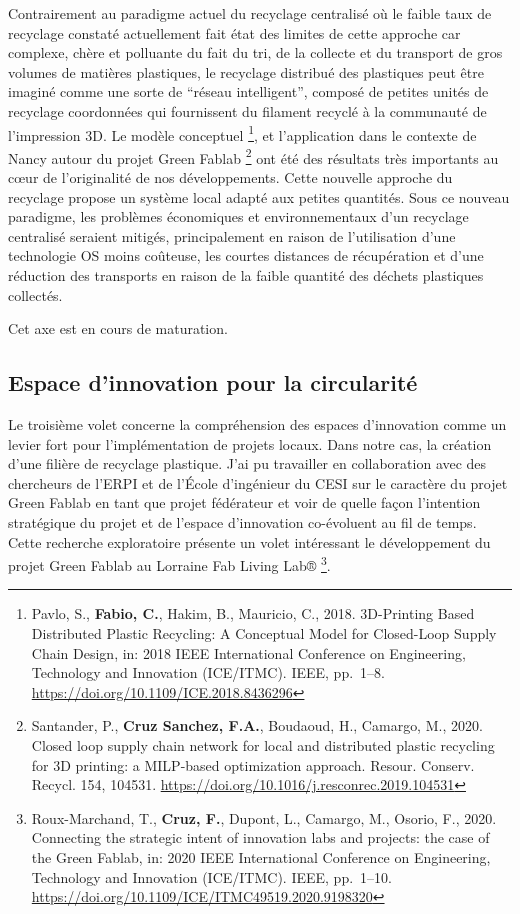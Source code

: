 \documentclass[
  12pt,
  oneside]{book}
\begin{document}
Contrairement au paradigme actuel du recyclage centralisé où le faible taux de recyclage constaté actuellement fait état des limites de cette approche car complexe, chère et polluante du fait du tri, de la collecte et du transport de gros volumes de matières plastiques, le recyclage distribué des plastiques peut être imaginé comme une sorte de ``réseau intelligent'', composé de petites unités de recyclage coordonnées qui fournissent du filament recyclé à la communauté de l'impression 3D.
Le modèle conceptuel \footnote{Pavlo, S., \textbf{Fabio, C.}, Hakim, B., Mauricio, C., 2018. 3D-Printing Based Distributed Plastic Recycling: A Conceptual Model for Closed-Loop Supply Chain Design, in: 2018 IEEE International Conference on Engineering, Technology and Innovation (ICE/ITMC). IEEE, pp.~1--8. \url{https://doi.org/10.1109/ICE.2018.8436296}}, et l'application dans le contexte de Nancy autour du projet Green Fablab \footnote{Santander, P., \textbf{Cruz Sanchez, F.A.}, Boudaoud, H., Camargo, M., 2020. Closed loop supply chain network for local and distributed plastic recycling for 3D printing: a MILP-based optimization approach. Resour. Conserv. Recycl. 154, 104531. \url{https://doi.org/10.1016/j.resconrec.2019.104531}} ont été des résultats très importants au cœur de l'originalité de nos développements.
Cette nouvelle approche du recyclage propose un système local adapté aux petites quantités. Sous ce nouveau paradigme, les problèmes économiques et environnementaux d'un recyclage centralisé seraient mitigés, principalement en raison de l'utilisation d'une technologie OS moins coûteuse, les courtes distances de récupération et d'une réduction des transports en raison de la faible quantité des déchets plastiques collectés.

Cet axe est en cours de maturation.

\hypertarget{espace-dinnovation-pour-la-circularituxe9}{%
\subsection{Espace d'innovation pour la circularité}\label{espace-dinnovation-pour-la-circularituxe9}}

Le troisième volet concerne la compréhension des espaces d'innovation comme un levier fort pour l'implémentation de projets locaux. Dans notre cas, la création d'une filière de recyclage plastique.
J'ai pu travailler en collaboration avec des chercheurs de l'ERPI et de l'École d'ingénieur du CESI sur le caractère du projet Green Fablab en tant que projet fédérateur et voir de quelle façon l'intention stratégique du projet et de l'espace d'innovation co-évoluent au fil de temps.
Cette recherche exploratoire présente un volet intéressant le développement du projet Green Fablab au Lorraine Fab Living Lab® \footnote{Roux-Marchand, T., \textbf{Cruz, F.}, Dupont, L., Camargo, M., Osorio, F., 2020. Connecting the strategic intent of innovation labs and projects: the case of the Green Fablab, in: 2020 IEEE International Conference on Engineering, Technology and Innovation (ICE/ITMC). IEEE, pp.~1--10. \url{https://doi.org/10.1109/ICE/ITMC49519.2020.9198320}}.
\end{document}
